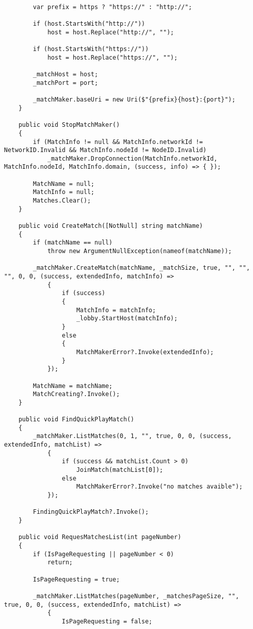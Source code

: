 \begin{lstlisting}
        var prefix = https ? "https://" : "http://";

        if (host.StartsWith("http://"))
            host = host.Replace("http://", "");

        if (host.StartsWith("https://"))
            host = host.Replace("https://", "");

        _matchHost = host;
        _matchPort = port;

        _matchMaker.baseUri = new Uri($"{prefix}{host}:{port}");
    }

    public void StopMatchMaker()
    {
        if (MatchInfo != null && MatchInfo.networkId != NetworkID.Invalid && MatchInfo.nodeId != NodeID.Invalid)
            _matchMaker.DropConnection(MatchInfo.networkId, MatchInfo.nodeId, MatchInfo.domain, (success, info) => { });

        MatchName = null;
        MatchInfo = null;
        Matches.Clear();
    }

    public void CreateMatch([NotNull] string matchName)
    {
        if (matchName == null)
            throw new ArgumentNullException(nameof(matchName));

        _matchMaker.CreateMatch(matchName, _matchSize, true, "", "", "", 0, 0, (success, extendedInfo, matchInfo) =>
            {
                if (success)
                {
                    MatchInfo = matchInfo;
                    _lobby.StartHost(matchInfo);
                }
                else
                {
                    MatchMakerError?.Invoke(extendedInfo);
                }
            });

        MatchName = matchName;
        MatchCreating?.Invoke();
    }

    public void FindQuickPlayMatch()
    {
        _matchMaker.ListMatches(0, 1, "", true, 0, 0, (success, extendedInfo, matchList) =>
            {
                if (success && matchList.Count > 0)
                    JoinMatch(matchList[0]);
                else
                    MatchMakerError?.Invoke("no matches avaible");
            });

        FindingQuickPlayMatch?.Invoke();
    }

    public void RequesMatchesList(int pageNumber)
    {
        if (IsPageRequesting || pageNumber < 0)
            return;

        IsPageRequesting = true;

        _matchMaker.ListMatches(pageNumber, _matchesPageSize, "", true, 0, 0, (success, extendedInfo, matchList) =>
            {
                IsPageRequesting = false;


\end{lstlisting}
